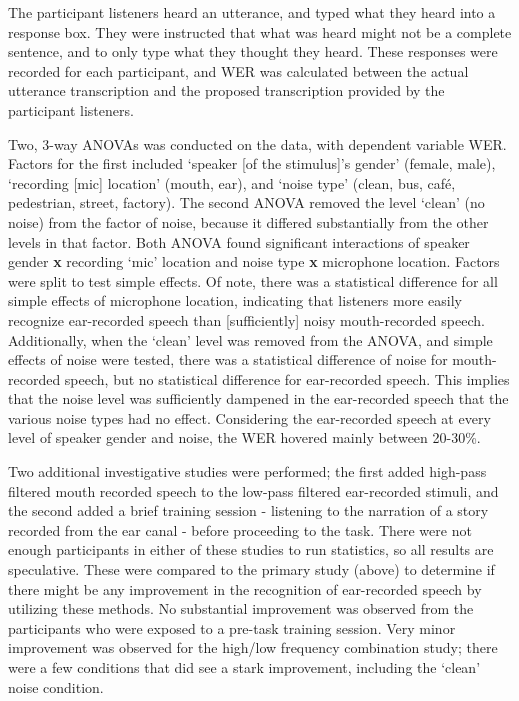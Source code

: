 The participant listeners heard an utterance, and typed what they heard into a response box.  They were instructed that what was heard might not be a complete sentence, and to only type what they thought they heard.  These responses were recorded for each participant, and WER was calculated between the actual utterance transcription and the proposed transcription provided by the participant listeners.

Two, 3-way ANOVAs was conducted on the data, with dependent variable WER.  Factors for the first included `speaker [of the stimulus]'s gender' (female, male), `recording [mic] location' (mouth, ear), and `noise type' (clean, bus, caf\'{e}, pedestrian, street, factory).  The second ANOVA removed the level `clean' (no noise) from the factor of noise, because it differed substantially from the other levels in that factor.  Both ANOVA found significant interactions of speaker gender \textbf{x} recording `mic' location and noise type \textbf{x} microphone location.  Factors were split to test simple effects.  Of note, there was a statistical difference for all simple effects of microphone location, indicating that listeners more easily recognize ear-recorded speech than [sufficiently] noisy mouth-recorded speech.  Additionally, when the `clean' level was removed from the ANOVA, and simple effects of noise were tested, there was a statistical difference of noise for mouth-recorded speech, but no statistical difference for ear-recorded speech.  This implies that the noise level was sufficiently dampened in the ear-recorded speech that the various noise types had no effect.  Considering the ear-recorded speech at every level of speaker gender and noise, the WER hovered mainly between 20-30\%.

Two additional investigative studies were performed; the first added high-pass filtered mouth recorded speech to the low-pass filtered ear-recorded stimuli, and the second added a brief training session - listening to the narration of a story recorded from the ear canal - before proceeding to the task.  There were not enough participants in either of these studies to run statistics, so all results are speculative.  These were compared to the primary study (above) to determine if there might be any improvement in the recognition of ear-recorded speech by utilizing these methods.  No substantial improvement was observed from the participants who were exposed to a pre-task training session.  Very minor improvement was observed for the high/low frequency combination study; there were a few conditions that did see a stark improvement, including the `clean' noise condition.

